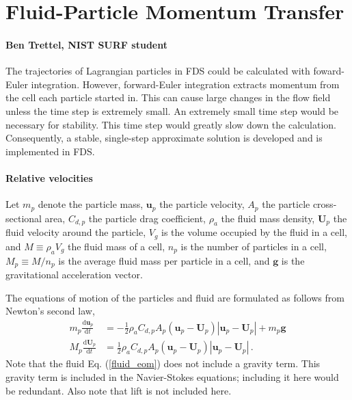 \chapter{Fluid-Particle Momentum Transfer}
\subsubsection{Ben Trettel, NIST SURF student}
The trajectories of Lagrangian particles in FDS could be calculated with foward-Euler integration. However, forward-Euler integration extracts momentum from the cell each particle started in. This can cause large changes in the flow field unless the time step is extremely small. An extremely small time step would be necessary for stability. This time step would greatly slow down the calculation. Consequently, a stable, single-step approximate solution is developed and is implemented in FDS.
\subsubsection{Relative velocities}
Let $m_p$ denote the particle mass, $\mathbf{u}_p$ the particle velocity, $A_p$ the particle cross-sectional area, $C_{d,p}$ the particle drag coefficient, $\rho_a$ the fluid mass density, $\mathbf{U}_p$ the fluid velocity around the particle, $V_g$ is the volume occupied by the fluid in a cell, and $M \equiv \rho_a V_g$ the fluid mass of a cell, $n_p$ is the number of particles in a cell, $M_p \equiv M/n_p$ is the average fluid mass per particle in a cell, and $\mathbf{g}$ is the gravitational acceleration vector.


The equations of motion of the particles and fluid are formulated as follows from Newton's second law,
\begin{align}
    \label{particle_eom}
    m_p \frac{\text{d} \mathbf{u}_p}{\text{d} t} &= - \frac{1}{2} \rho_a C_{d,p} A_p (\mathbf{u}_p - \mathbf{U}_p) |\mathbf{u}_p - \mathbf{U}_p| + m_p \mathbf{g} \\
    \label{fluid_eom}
    M_p \frac{\text{d} \mathbf{U}_p}{\text{d} t} &= \frac{1}{2} \rho_a C_{d,p} A_p (\mathbf{u}_p - \mathbf{U}_p) |\mathbf{u}_p - \mathbf{U}_p| \,.
\end{align}
Note that the fluid Eq. (\ref{fluid_eom}) does not include a gravity term. This gravity term is included in the Navier-Stokes equations; including it here would be redundant. Also note that lift is not included here.


